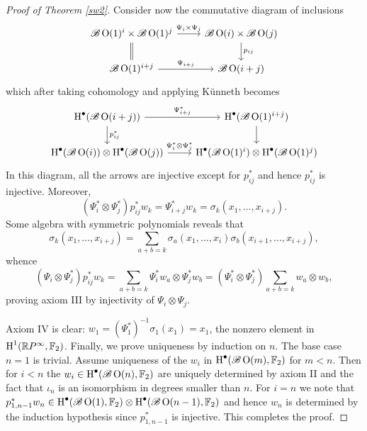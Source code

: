 \documentclass{amsart}
\begin{document}
\begin{proof}[Proof of Theorem \ref{sw2}]
    Consider now the commutative diagram of inclusions
    \begin{equation*}
        \begin{tikzcd}
            \mathscr{B}\OO(1)^i\times\mathscr{B}\OO(1)^j\ar{r}{\Psi_i\times\Psi_j}\ar[equal]{d} & \mathscr{B}\OO(i)\times\mathscr{B}\OO(j)\ar{d}{p_{ij}}\\
            \mathscr{B}\OO(1)^{i+j}\ar{r}{\Psi_{i+j}} & \mathscr{B}\OO(i+j)
        \end{tikzcd}
    \end{equation*}
    which after taking cohomology and applying K\"unneth becomes
    \begin{equation*}
        \begin{tikzcd}
            \HH^\bullet(\mathscr{B}\OO(i+j))\ar{r}{\Psi_{i+j}^*}\ar{d}{p_{ij}^*} & \HH^\bullet(\mathscr{B}\OO(1)^{i+j})\ar{d}\\
            \HH^\bullet(\mathscr{B}\OO(i))\otimes\HH^\bullet(\mathscr{B}\OO(j))\ar{r}{\Psi_i^*\otimes\Psi_j^*} & \HH^\bullet(\mathscr{B}\OO(1)^i)\otimes\HH^\bullet(\mathscr{B}\OO(1)^j)
        \end{tikzcd}
    \end{equation*}
    In this diagram, all the arrows are injective except for $p_{ij}^*$ and hence $p_{ij}^*$
    is injective. Moreover,
    \begin{equation*}
        (\Psi_i^*\otimes\Psi_j^*) p_{ij}^*w_k = \Psi_{i+j}^*w_k = \sigma_k(x_1,\ldots,x_{i+j}).
    \end{equation*}
    Some algebra with symmetric polynomials reveals that
    \begin{equation*}
        \sigma_k(x_1,\ldots,x_{i+j}) = \sum_{a+b=k}\sigma_a(x_1,\ldots,x_i)\sigma_b(x_{i+1},\ldots,x_{i+j}),
    \end{equation*}
    whence
    \begin{equation*}
        (\Psi_i\otimes\Psi_j^*)p_{ij}^*w_k = \sum_{a+b=k}\Psi_i^*w_a\otimes\Psi_j^*w_b = (\Psi_i^*\otimes\Psi_j^*)\sum_{a+b=k}w_a\otimes w_b,
    \end{equation*}
    proving axiom III by injectivity of $\Psi_i\otimes\Psi_j$.

    Axiom IV is clear: $w_1=(\Psi_1^*)^{-1}\sigma_1(x_1)=x_1$, the nonzero element in $\operatorname{H}^1(\mathbb{R} P^\infty,\mathbb{F}_2)$.
    Finally, we prove uniqueness by induction on $n$. The base case $n=1$ is trivial.
    Assume uniqueness of the $w_i$ in $\operatorname{H}^\bullet(\mathscr{B}\operatorname{O}(m),\mathbb{F}_2)$ for $m<n$.
    Then for $i<n$ the $w_i\in\operatorname{H}^\bullet(\mathscr{B}\operatorname{O}(n),\mathbb{F}_2)$ are uniquely determined by
    axiom II and the fact that $\iota_n$ is an isomorphism in degrees smaller than $n$.
    For $i=n$ we note that $p_{1,n-1}^*w_n\in\operatorname{H}^\bullet(\mathscr{B}\operatorname{O}(1),\mathbb{F}_2)\otimes\operatorname{H}^\bullet(\mathscr{B}\operatorname{O}(n-1),\mathbb{F}_2)$
    and hence $w_n$ is determined by the induction hypothesis since $p_{1,n-1}^*$ is injective.
    This completes the proof.
\end{proof}
\end{document}
